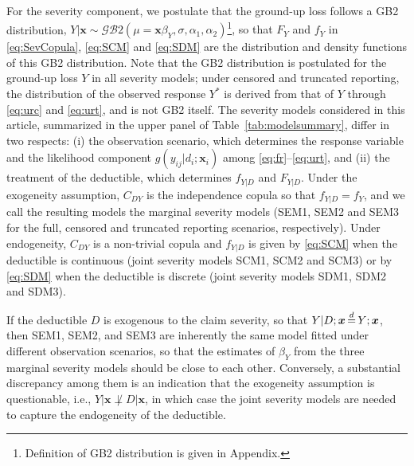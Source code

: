 \documentclass[11pt]{article}
\newcommand{\rev}[1]{{\color{blue}#1}}
\begin{document}
For the severity component, we postulate \rev{that the ground-up loss follows a} GB2 distribution\rev{, $Y|\bm{x} \sim \mathcal{GB}2(\mu=\bm{x}\beta_{Y}, \sigma, \alpha_1, \alpha_2)$\footnote{Definition of GB2 distribution is given in Appendix.}, so that $F_{Y}$ and $f_{Y}$ in \eqref{eq:SevCopula}, \eqref{eq:SCM} and \eqref{eq:SDM} are the distribution and density functions of this GB2 distribution. Note that the GB2 distribution is postulated for the ground-up loss $Y$ in all severity models; under censored and truncated reporting, the distribution of the observed response $Y^*$ is derived from that of $Y$ through \eqref{eq:urc} and \eqref{eq:urt}, and is not GB2 itself. The severity models considered in this article, summarized in the upper panel of Table~\ref{tab:modelsummary}, differ in two respects: (i) the observation scenario, which determines the response variable and the likelihood component $g(y_{ij}|d_i;\bm{x}_i)$ among \eqref{eq:fr}--\eqref{eq:urt}, and (ii) the treatment of the deductible, which determines $f_{Y|D}$ and $F_{Y|D}$. Under the exogeneity assumption, $C_{DY}$ is the independence copula so that $f_{Y|D}=f_{Y}$, and we call the resulting models the marginal severity models (SEM1, SEM2 and SEM3 for the full, censored and truncated reporting scenarios, respectively). Under endogeneity, $C_{DY}$ is a non-trivial copula and $f_{Y|D}$ is given by \eqref{eq:SCM} when the deductible is continuous (joint severity models SCM1, SCM2 and SCM3) or by \eqref{eq:SDM} when the deductible is discrete (joint severity models SDM1, SDM2 and SDM3).}

\rev{If the deductible $D$ is exogenous to the claim severity, so that $Y|D; \bm{x}  \,{\buildrel d \over =}\,   Y;\bm{x}$, then SEM1, SEM2, and SEM3 are inherently the same model fitted under different observation scenarios, so that the estimates of $\beta_{Y}$ from the three marginal severity models should be close to each other. Conversely, a substantial discrepancy among them is an indication that the exogeneity assumption is questionable, i.e., $Y|\bm{x} \not\perp D|\bm{x}$, in which case the joint severity models are needed to capture the endogeneity of the deductible.}
\end{document}

